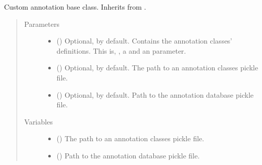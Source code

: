 \documentclass[letterpaper,10pt,english]{sphinxmanual}
\begin{document}

\begin{fulllineitems}
\label{\detokenize{reference:pypath.annot.CustomAnnotation}}
Custom annotation base class. Inherits from
.
\begin{quote}\begin{description}
\item[{Parameters}] \leavevmode\begin{itemize}
\item {} 
 () \textendash{} Optional,  by default. Contains the annotation classes’
definitions. This is, , a  and an
 parameter.

\item {} 
 () \textendash{} Optional,  by default. The path to an annotation classes
pickle file.

\item {} 
 () \textendash{} Optional,  by default. Path to the annotation database
pickle file.

\end{itemize}

\item[{Variables}] \leavevmode\begin{itemize}
\item {} 
 () \textendash{} The path to an annotation classes pickle file.

\item {} 
 () \textendash{} Path to the annotation database pickle file.


\end{itemize}
\end{description}
\end{quote}
\end{fulllineitems}
\end{document}
